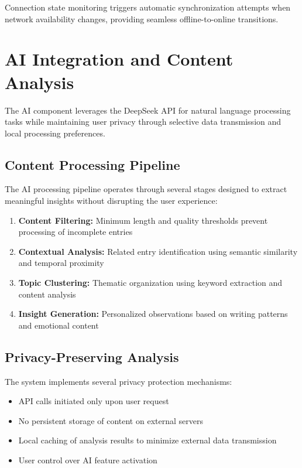 \documentclass[conference]{IEEEtran}
\begin{document}
Connection state monitoring triggers automatic synchronization attempts when network availability changes, providing seamless offline-to-online transitions.

\section{AI Integration and Content Analysis}

The AI component leverages the DeepSeek API for natural language processing tasks while maintaining user privacy through selective data transmission and local processing preferences.

\subsection{Content Processing Pipeline}

The AI processing pipeline operates through several stages designed to extract meaningful insights without disrupting the user experience:

\begin{enumerate}
\item \textbf{Content Filtering:} Minimum length and quality thresholds prevent processing of incomplete entries
\item \textbf{Contextual Analysis:} Related entry identification using semantic similarity and temporal proximity
\item \textbf{Topic Clustering:} Thematic organization using keyword extraction and content analysis
\item \textbf{Insight Generation:} Personalized observations based on writing patterns and emotional content
\end{enumerate}

\subsection{Privacy-Preserving Analysis}

The system implements several privacy protection mechanisms:
\begin{itemize}
\item API calls initiated only upon user request
\item No persistent storage of content on external servers
\item Local caching of analysis results to minimize external data transmission
\item User control over AI feature activation
\end{itemize}
\end{document}
